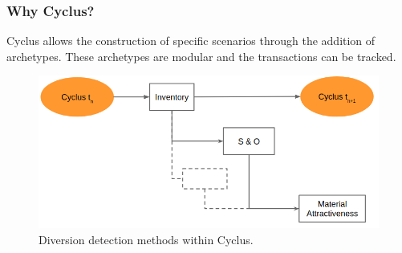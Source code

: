 \begin{frame}
\frametitle{Why Cyclus?}
Cyclus allows the construction of specific scenarios through the addition of archetypes. These archetypes are
modular and the transactions can be tracked.
	\begin{figure}
		\centering
		\includegraphics[width=0.9\linewidth]{diversion1}
		\caption{Diversion detection methods within Cyclus.}
		\label{fig:diversion}
	\end{figure}
\end{frame}
